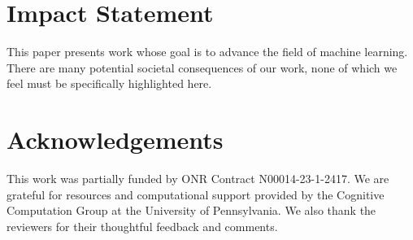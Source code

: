 

\section*{Impact Statement}
This paper presents work whose goal is to advance the field of machine learning. There are many potential societal consequences of our work, none of which we feel must be specifically highlighted here.

\section*{Acknowledgements}
This work was partially funded by ONR Contract N00014-23-1-2417. We are grateful for resources and computational support provided by the Cognitive Computation Group at the University of Pennsylvania. We also thank the reviewers for their thoughtful feedback and comments.
